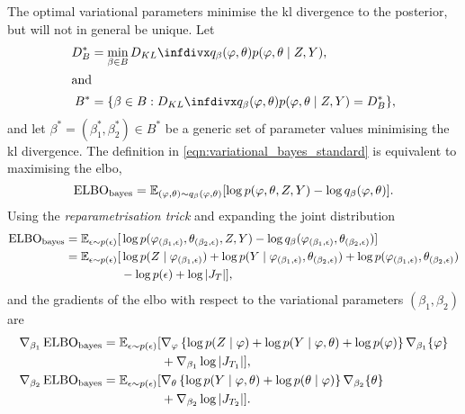 The optimal variational parameters minimise the \acrshort*{kl} divergence to the posterior, but will not in general be unique.
Let
\begin{align}
  D^*_B & =\min_{\beta\in B} \kl{ q_{\beta}(\varphi, \theta) }{ p(\varphi, \theta \mid Z, Y) },\label{eqn:variational_bayes_standard_Dstar} \\
  \intertext{and}
  B^*   & = \{\beta\in B:  \kl{ q_{\beta}(\varphi, \theta) }{ p(\varphi, \theta \mid Z, Y) }=D^*_B\},\label{eqn:variational_bayes_standard}
\end{align}
and let $\beta^*=(\beta^*_1,\beta^*_2)\in B^*$ be a generic set of parameter values minimising the \acrshort*{kl} divergence.
The definition in \cref{eqn:variational_bayes_standard} is equivalent to maximising the \acrshort*{elbo},
\begin{equation}\label{eq:elbo_modular}
  \operatorname{\text{ELBO}}_{\operatorname{\text{bayes}}} = \operatorname{\mathbb{E}}_{(\varphi, \theta) \sim q_{\beta}(\varphi, \theta)}[ \log p(\varphi, \theta, Z, Y) - \log q_{\beta}(\varphi, \theta) ].
\end{equation}
Using the \emph{reparametrisation trick} and expanding the joint distribution
\begin{align*}
  \operatorname{\text{ELBO}}_{\operatorname{\text{bayes}}} = \operatorname{\mathbb{E}}_{\epsilon \sim p(\epsilon)}[ & \log p(\varphi_{(\beta_1,\epsilon)}, \theta_{(\beta_2,\epsilon)}, Z, Y) - \log q_{\beta}(\varphi_{(\beta_1,\epsilon)}, \theta_{(\beta_2,\epsilon)}) ]                                      \\
  = \operatorname{\mathbb{E}}_{\epsilon \sim p(\epsilon)}[                & \log p(Z \mid \varphi_{(\beta_1,\epsilon)}) + \log p(Y \mid \varphi_{(\beta_1,\epsilon)}, \theta_{(\beta_2,\epsilon)}) + \log p(\varphi_{(\beta_1,\epsilon)}, \theta_{(\beta_2,\epsilon)}) \\
                                                   & - \log p(\epsilon) + \log \left\vert J_{T} \right\vert  ],
\end{align*}
and the gradients of the \acrshort*{elbo} with respect to the variational parameters $(\beta_1,\beta_2)$ are
\begin{align}
  \nabla_{\beta_1} \operatorname{\text{ELBO}}_{\operatorname{\text{bayes}}} = \operatorname{\mathbb{E}}_{\epsilon \sim p(\epsilon)}[ & \nabla_{\varphi} \left\{ \log p(Z \mid \varphi) + \log p(Y \mid \varphi, \theta) + \log p(\varphi) \right\} \nabla_{\beta_1} \{ \varphi \} \nonumber             \\
                                                                    & + \nabla_{\beta_1} \log \left\vert J_{T_1} \right\vert  ]  \label{eq:grad_elbo_l1_full},                                                                         \\
  \nabla_{\beta_2} \operatorname{\text{ELBO}}_{\operatorname{\text{bayes}}} = \operatorname{\mathbb{E}}_{\epsilon \sim p(\epsilon)}[ & \nabla_{\theta} \left\{ \log p(Y \mid \varphi, \theta) + \log p(\theta \mid \varphi) \right\} \nabla_{\beta_2} \{ \theta \}                            \nonumber \\
                                                                    & + \nabla_{\beta_2} \log \left\vert J_{T_2} \right\vert  ]. \label{eq:grad_elbo_l2_full}
\end{align}
